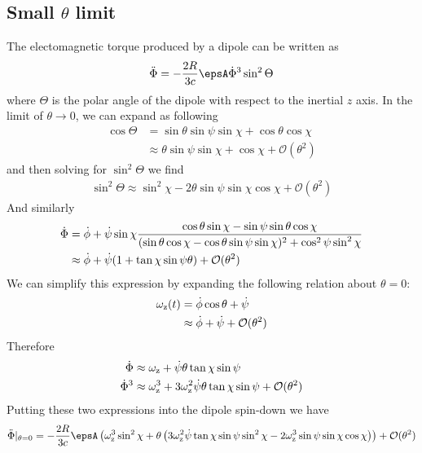 \documentclass[/home/greg/Thesis/main/main.tex]{subfiles}
\begin{document}
\subsection{Small $\theta$ limit}
The electomagnetic torque produced by a dipole can be written as 
\begin{equation}
\Phiddot = -\frac{2R}{3c}\epsA \Phidot^{3} \sin^{2}\Theta
\end{equation}
where $\Theta$ is the polar angle of the dipole with respect to the inertial
$z$ axis. In the limit of $\theta \rightarrow 0$, we can expand as following
\begin{align}
\cos\Theta &= \sin\theta \sin\psi \sin\chi + \cos\theta \cos \chi \\
& \approx \theta\sin\psi \sin\chi  + \cos\chi + \mathcal{O}(\theta^{2})
\end{align}
and then solving for $\sin^{2}\Theta$ we find
\begin{align}
\sin^{2}\Theta \approx \sin^{2}\chi - 2\theta \sin\psi \sin\chi\cos\chi + \mathcal{O}(\theta^{2})
\end{align}
And similarly 
\begin{align}
\dot{\Phi} &= \dot{\phi} + \dot{\psi} \sin\chi 
\frac{\cos\theta \sin\chi - \sin\psi \sin \theta \cos \chi}
{(\sin\theta\cos\chi - \cos\theta \sin \psi \sin \chi)^{2} + \cos^{2}\psi \sin^{2}\chi}
\\
& \approx \dot{\phi} + \dot{\psi} (1 + \tan\chi \sin\psi \theta) + \mathcal{O}(\theta^{2})
\end{align}
We can simplify this expression by expanding the following relation about 
$\theta=0$:
\begin{align}
\omega_{\mathrm{z}}(t) &= \dot{\phi} \cos\theta + \dot{\psi} \\
&\approx \dot{\phi} + \dot{\psi} + \mathcal{O}(\theta^{2})
\end{align}
Therefore
\begin{align}
\dot{\Phi} & \approx \omega_{\mathrm{z}} + \dot{\psi} \theta \tan \chi \sin\psi \\
\dot{\Phi}^{3} & \approx \omega_{\mathrm{z}}^{3} + 3 \omega_{\mathrm{z}}^{2}\dot{\psi}\theta \tan \chi \sin\psi +
\mathcal{O}(\theta^{2})
\end{align}
Putting these two expressions into the dipole spin-down we have
\begin{equation}
\Phiddot |_{\theta=0} = -\frac{2R}{3c} \epsA \left(
\wz^{3} \sin^{2}\chi + \theta \left(
3\wz^{2} \dot{\psi}\tan \chi \sin\psi \sin^{2}\chi - 2\wz^{3}\sin\psi\sin\chi\cos\chi\right)
\right) + \mathcal{O}(\theta^{2})
\end{equation}
\end{document}
